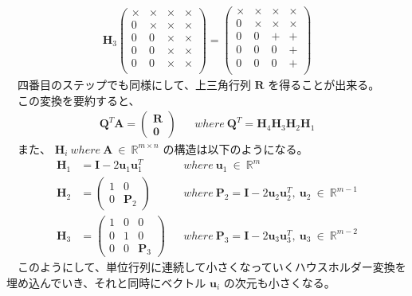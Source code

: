\documentclass[a4paper,10pt]{jarticle}
\begin{document}
\begin{align*}
\bm{H}_3
\begin{pmatrix}
\times & \times & \times & \times \\
0 & \times & \times & \times \\
0 & 0 & \times & \times \\
0 & 0 & \times & \times \\
0 & 0 & \times & \times \\
\end{pmatrix}
=
\begin{pmatrix}
\times & \times & \times & \times \\
0 & \times & \times & \times \\
0 & 0 & + & + \\
0 & 0 & 0 & + \\
0 & 0 & 0 & + \\
\end{pmatrix}
\end{align*}
　四番目のステップでも同様にして、上三角行列 \(\bm{R}\) を得ることが出来る。\\
　この変換を要約すると、\\
\begin{align*}
\bm{Q}^T\bm{A}=
\begin{pmatrix}
\bm{R} \\
\bm{0}
\end{pmatrix}
&& where\ \bm{Q}^T =\bm{H}_4\bm{H}_3\bm{H}_2\bm{H}_1
\end{align*}
　また、 \(\bm{H}_i\ where\ \bm{A}\ \in\ \mathbb{R}^{m\times n}\) の構造は以下のようになる。\\
\begin{align*}
\bm{H}_1 &= \bm{I} - 2\bm{u}_1\bm{u}_1^T && where\ \bm{u}_1\ \in\ \mathbb{R}^m \nonumber \\
\bm{H}_2 &= 
\begin{pmatrix}
1 & 0 \\
0 & \bm{P}_2
\end{pmatrix}
&& where\ \bm{P}_2=\bm{I} - 2\bm{u}_2\bm{u}_2^T,\ \bm{u}_2\ \in\ \mathbb{R}^{m-1}
\nonumber \\ 
\bm{H}_3 &= 
\begin{pmatrix}
1 & 0 & 0 \\
0 & 1 & 0 \\
0 & 0 & \bm{P}_3 
\end{pmatrix}
&& where\ \bm{P}_3=\bm{I} - 2\bm{u}_3\bm{u}_3^T,\ \bm{u}_3\ \in\ \mathbb{R}^{m-2}
\end{align*}
　このようにして、単位行列に連続して小さくなっていくハウスホルダー変換を埋め込んでいき、それと同時にベクトル \(\bm{u}_i\) の次元も小さくなる。\\
\end{document}
